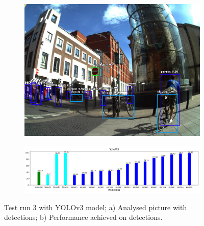         \begin{figure}[H]
          \centering
          \captionsetup{justification=centering}
  
          \begin{subfigure}{0.29\textwidth}
          \includegraphics[width=\textwidth]{Sections/4InitialWork/4_images_obj_run4/yolo.jpg} 
          \caption{}
          \end{subfigure}
          \begin{subfigure}{0.7\textwidth}
          \includegraphics[width=\textwidth]{Sections/4InitialWork/4_images_obj_run4/yolo_graph.png}
          \caption{}
          \end{subfigure}
          
          \caption[Test run 3 with YOLOv3]{ 
          Test run 3 with YOLOv3 model; a) Analysed picture with detections; b) Performance achieved on detections. }
          \label{fig:yolo_3}
          \end{figure}
  

